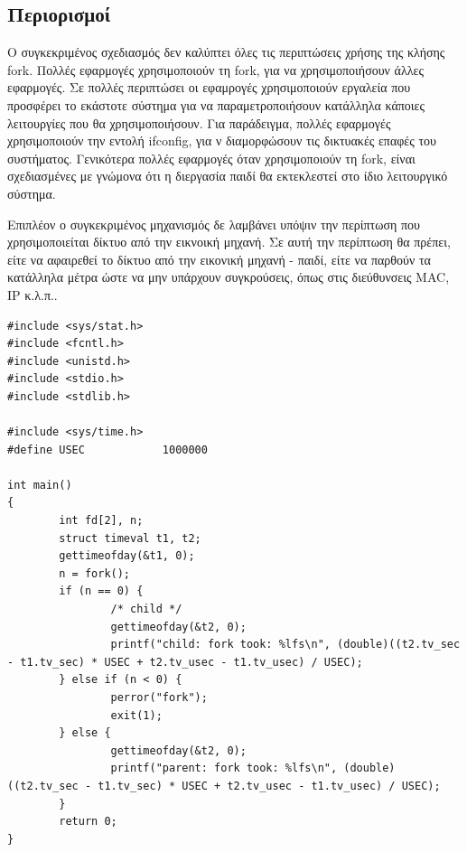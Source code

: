 \subsection{Περιορισμοί}
Ο συγκεκριμένος σχεδιασμός δεν καλύπτει όλες τις περιπτώσεις χρήσης της κλήσης
fork. Πολλές εφαρμογές χρησιμοποιούν τη fork, για να χρησιμοποιήσουν άλλες
εφαρμογές. Σε πολλές περιπτώσει οι εφαμρογές χρησιμοποιούν εργαλεία που
προσφέρει το εκάστοτε σύστημα για να παραμετροποιήσουν κατάλληλα κάποιες
λειτουργίες που θα χρησιμοποιήσουν. Για παράδειγμα, πολλές εφαρμογές
χρησιμοποιούν την εντολή ifconfig, για ν διαμορφώσουν τις δικτυακές επαφές του
συστήματος. Γενικότερα πολλές εφαρμογές όταν χρησιμοποιούν τη fork, είναι
σχεδιασμένες με γνώμονα ότι η διεργασία παιδί θα εκτεκλεστεί στο ίδιο
λειτουργικό σύστημα.

Επιπλέον ο συγκεκριμένος μηχανισμός δε λαμβάνει υπόψιν την περίπτωση
που χρησιμοποιείται δίκτυο από την εικνοική μηχανή. Σε αυτή την περίπτωση θα
πρέπει, είτε να αφαιρεθεί το δίκτυο από την εικονική μηχανή - παιδί, είτε να
παρθούν τα κατάλληλα μέτρα ώστε να μην υπάρχουν συγκρούσεις, όπως στις
διεύθυνσεις MAC, IP κ.λ.π.. 

\begin{lstlisting}[label={time_test}]
#include <sys/stat.h>
#include <fcntl.h>
#include <unistd.h>
#include <stdio.h>
#include <stdlib.h>

#include <sys/time.h>
#define USEC            1000000

int main()
{
        int fd[2], n;
        struct timeval t1, t2;
        gettimeofday(&t1, 0);
        n = fork();
        if (n == 0) {
                /* child */
                gettimeofday(&t2, 0);
                printf("child: fork took: %lfs\n", (double)((t2.tv_sec - t1.tv_sec) * USEC + t2.tv_usec - t1.tv_usec) / USEC);
        } else if (n < 0) {
                perror("fork");
                exit(1);
        } else {
                gettimeofday(&t2, 0);
                printf("parent: fork took: %lfs\n", (double)((t2.tv_sec - t1.tv_sec) * USEC + t2.tv_usec - t1.tv_usec) / USEC);
        }
        return 0;
}

\end{lstlisting}
